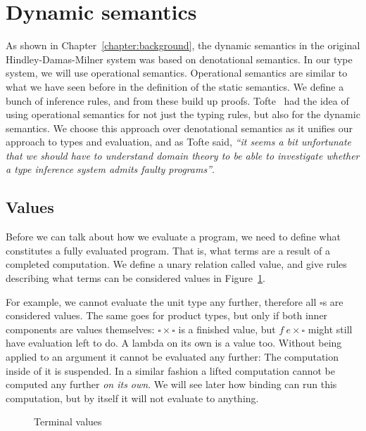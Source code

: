 
\section{Dynamic semantics}
As shown in Chapter~\ref{chapter:background}, the dynamic semantics in
the original Hindley-Damas-Milner system was based on denotational
semantics. In our type system, we will use operational
semantics. Operational semantics are similar to what we have seen
before in the definition of the static semantics. We define a bunch of
inference rules, and from these build up
proofs. Tofte~\cite{tofte1988} had the idea of using operational
semantics for not just the typing rules, but also for the dynamic
semantics. We choose this approach over denotational semantics as it
unifies our approach to types and evaluation, and as Tofte said,
\textsl{``it seems a bit unfortunate that we should have to understand
  domain theory to be able to investigate whether a type inference
  system admits faulty programs''}.

\subsection{Values}
Before we can talk about how we evaluate a program, we need to define
what constitutes a fully evaluated program. That is, what terms are a
result of a completed computation. We define a unary relation called
\textsf{value}, and give rules describing what terms can be considered
values in Figure~\ref{fig:values}.

For example, we cannot evaluate the unit type any further, therefore
all $\square$s are considered values. The same goes for product types, but
only if both inner components are values themselves:
$\square \times \square$ is a finished value, but
$f \ e \times \square$ might still have evaluation left to do. A lambda on its
own is a value too. Without being applied to an argument it cannot be
evaluated any further: The computation inside of it is suspended. In a
similar fashion a lifted computation cannot be computed any further
\textit{on its own}. We will see later how binding can run this
computation, but by itself it will not evaluate to anything.

\begin{figure}
  \caption{Terminal values}\label{fig:values}
\end{figure}

